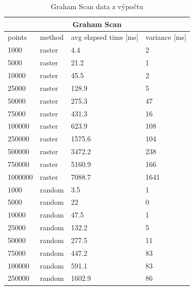 \documentclass[12pt]{article}
\begin{document}
\begin{table}[h!]
\centering
\caption{Graham Scan data z výpočtu}
\begin{tabular}{|l|l|l|l|}
\hline
\multicolumn{4}{|c|}{\textbf{Graham Scan}}                                \\ \hline
points  & method & avg elapsed time {[}ms{]} & variance {[}ms{]} \\ \hline
1000    & raster & 4.4                       & 2                 \\ \hline
5000    & raster & 21.2                      & 1                 \\ \hline
10000   & raster & 45.5                      & 2                 \\ \hline
25000   & raster & 128.9                     & 5                 \\ \hline
50000   & raster & 275.3                     & 47                \\ \hline
75000   & raster & 431.3                     & 16                \\ \hline
100000  & raster & 623.9                     & 108               \\ \hline
250000  & raster & 1575.6                    & 104               \\ \hline
500000  & raster & 3472.2                    & 238               \\ \hline
750000  & raster & 5160.9                    & 166               \\ \hline
1000000 & raster & 7088.7                    & 1641              \\ \hline
1000    & random & 3.5                       & 1                 \\ \hline
5000    & random & 22                        & 0                 \\ \hline
10000   & random & 47.5                      & 1                 \\ \hline
25000   & random & 132.2                     & 5                 \\ \hline
50000   & random & 277.5                     & 11                \\ \hline
75000   & random & 447.2                     & 83                \\ \hline
100000  & random & 591.1                     & 83                \\ \hline
250000  & random & 1602.9                    & 86                \\ \hline

\end{tabular}
\end{table}
\end{document}
